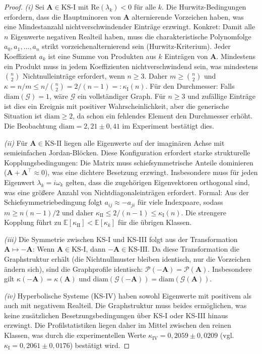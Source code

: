 \documentclass[a4paper, 12pt, twoside, openright]{report}
\theoremstyle{definition}
\theoremstyle{definition}
\newcommand{\vA}{\bm{A}}
\newcommand{\T}{\top}
\newcommand{\re}{\mathrm{Re}}
\newcommand{\KS}{\mathrm{KS}}
\begin{document}
\begin{proof}
\textit{(i)} Sei $\vA \in \KS\text{-I}$ mit $\re(\lambda_k) < 0$ für alle $k$.
Die Hurwitz-Bedingungen erfordern, dass die Hauptminoren von $\vA$ alternierende
Vorzeichen haben, was eine Mindestanzahl nichtverschwindender Einträge erzwingt.
Konkret: Damit alle $n$ Eigenwerte negativen Realteil haben, muss die charakteristische
Polynomfolge $a_0, a_1, \ldots, a_n$ strikt vorzeichenalternierend sein (Hurwitz-Kriterium).
Jeder Koeffizient $a_k$ ist eine Summe von Produkten aus $k$ Einträgen von $\vA$.
Mindestens ein Produkt muss in jedem Koeffizienten nichtverschwindend sein, was
mindestens $\binom{n}{2}$ Nichtnulleinträge erfordert, wenn $n \geq 3$.
Daher $m \geq \binom{n}{2}$ und $\kappa = n/m \leq n/\binom{n}{2} = 2/(n-1) =:
\kappa_{\mathrm{I}}(n)$.
Für den Durchmesser: Falls $\mathrm{diam}(\mathcal{G}) = 1$, wäre $\mathcal{G}$
ein vollständiger Graph. Für $n \geq 3$ und zufällige Einträge ist dies ein
Ereignis mit positiver Wahrscheinlichkeit, aber die generische Situation ist
$\mathrm{diam} \geq 2$, da schon ein fehlendes Element den Durchmesser erhöht.
Die Beobachtung $\mathrm{diam} = 2{,}21 \pm 0{,}41$ im Experiment bestätigt dies.

\textit{(ii)} Für $\vA \in \KS\text{-II}$ liegen alle Eigenwerte auf der imaginären
Achse mit semieinfachen Jordan-Blöcken. Diese Konfiguration erfordert starke strukturelle
Kopplungsbedingungen: Die Matrix muss schiefsymmetrische Anteile dominieren
($\vA + \vA^\T \approx 0$), was eine dichtere Besetzung erzwingt. Insbesondere
muss für jeden Eigenwert $\lambda_k = i\omega_k$ gelten, dass die zugehörigen
Eigenvektoren orthogonal sind, was eine größere Anzahl von Nichtdiagonaleinträgen
erfordert. Formal: Aus der Schiefsymmetriebedingung folgt $a_{ij} \approx -a_{ji}$
für viele Indexpaare, sodass $m \geq n(n-1)/2$ und daher
$\kappa_{\mathrm{II}} \leq 2/(n-1) \leq \kappa_{\mathrm{I}}(n)$.
Die strengere Kopplung führt zu $\mathbb{E}[\kappa_{\mathrm{II}}] < \mathbb{E}[\kappa_k]$
für die übrigen Klassen.

\textit{(iii)} Die Symmetrie zwischen KS-I und KS-III folgt aus der Transformation
$\vA \mapsto -\vA$: Wenn $\vA \in \KS\text{-I}$, dann $-\vA \in \KS\text{-III}$.
Da diese Transformation die Graphstruktur erhält (die Nichtnullmuster bleiben identisch,
nur die Vorzeichen ändern sich), sind die Graphprofile identisch:
$\mathcal{P}(-\vA) = \mathcal{P}(\vA)$. Insbesondere gilt
$\kappa(-\vA) = \kappa(\vA)$ und $\mathrm{diam}(\mathcal{G}(-\vA)) =
\mathrm{diam}(\mathcal{G}(\vA))$.

\textit{(iv)} Hyperbolische Systeme (KS-IV) haben sowohl Eigenwerte mit positivem als
auch mit negativem Realteil. Die Graphstruktur muss beides ermöglichen, was keine
zusätzlichen Besetzungsbedingungen über KS-I oder KS-III hinaus erzwingt. Die
Profilstatistiken liegen daher im Mittel zwischen den reinen Klassen, was durch
die experimentellen Werte $\kappa_{\mathrm{IV}} = 0{,}2059 \pm 0{,}0209$
(vgl.\ $\kappa_{\mathrm{I}} = 0{,}2061 \pm 0{,}0176$) bestätigt wird.
\end{proof}
\end{document}
